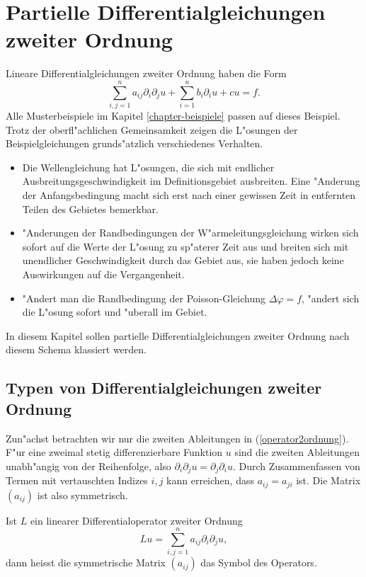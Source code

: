 \chapter{Partielle Differentialgleichungen zweiter Ordnung\label{chapter-2ordnung}}
Lineare Differentialgleichungen zweiter Ordnung haben die Form
\begin{equation}
\sum_{i,j=1}^na_{ij}\partial_i\partial_j u+\sum_{i=1}^nb_i\partial_i u+cu=f.
\label{operator2ordnung}
\end{equation}
Alle Musterbeispiele im Kapitel \ref{chapter-beispiele} passen auf dieses 
Beispiel. Trotz der oberfl"achlichen Gemeinsamkeit zeigen die L"osungen
der Beispielgleichungen grunds"atzlich verschiedenes Verhalten.
\begin{itemize}
\item Die Wellengleichung hat L"osungen, die sich mit endlicher
Ausbreitungsgeschwindigkeit im Definitionsgebiet ausbreiten. Eine "Anderung
der Anfangsbedingung macht sich erst nach einer gewissen Zeit in
entfernten Teilen des Gebietes bemerkbar.
\item "Anderungen der Randbedingungen der W"armeleitungsgleichung wirken
sich sofort auf die Werte der L"osung zu sp"aterer Zeit aus und breiten
sich mit unendlicher Geschwindigkeit durch das Gebiet aus, sie haben jedoch
keine Auswirkungen auf die Vergangenheit.
\item "Andert man die Randbedingung der Poisson-Gleichung $\Delta \varphi=f$,
"andert sich die L"osung sofort und "uberall im Gebiet.
\end{itemize}
In diesem Kapitel sollen partielle Differentialgleichungen zweiter Ordnung
nach diesem Schema klassiert werden.

\section{Typen von Differentialgleichungen zweiter Ordnung}
Zun"achst betrachten wir nur die zweiten Ableitungen in (\ref{operator2ordnung}).
F"ur eine zweimal stetig differenzierbare Funktion $u$ sind die zweiten
Ableitungen unabh"angig von der Reihenfolge, also
$\partial_i\partial_ju=\partial_j\partial_iu$.
Durch Zusammenfassen von Termen mit vertauschten Indizes $i,j$ kann 
erreichen, dass $a_{ij}=a_{ji}$ ist.
Die Matrix $(a_{ij})$ ist also symmetrisch.

\begin{definition}Ist $L$ ein linearer Differentialoperator zweiter Ordnung
$$Lu=\sum_{i,j=1}^na_{ij}\partial_i\partial_ju,$$
dann heisst die symmetrische Matrix
$(a_{ij})$ das Symbol des Operators.
\end{definition}

